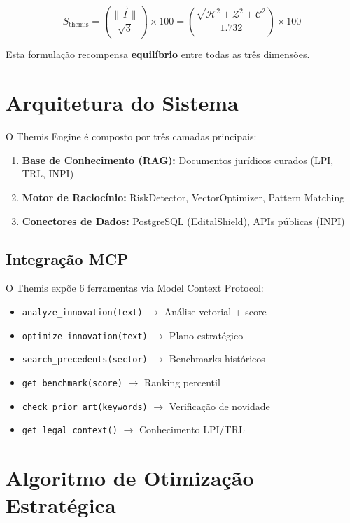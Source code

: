 \documentclass[12pt,a4paper]{article}
\begin{document}
\begin{equation}
S_{\text{themis}} = \left( \frac{\|\vec{I}\|}{\sqrt{3}} \right) \times 100 = \left( \frac{\sqrt{\mathcal{H}^2 + \mathcal{Z}^2 + \mathcal{C}^2}}{1.732} \right) \times 100
\end{equation}

Esta formulação recompensa \textbf{equilíbrio} entre todas as três dimensões.

\section{Arquitetura do Sistema}

O Themis Engine é composto por três camadas principais:

\begin{enumerate}
    \item \textbf{Base de Conhecimento (RAG):} Documentos jurídicos curados (LPI, TRL, INPI)
    \item \textbf{Motor de Raciocínio:} RiskDetector, VectorOptimizer, Pattern Matching
    \item \textbf{Conectores de Dados:} PostgreSQL (EditalShield), APIs públicas (INPI)
\end{enumerate}

\subsection{Integração MCP}

O Themis expõe 6 ferramentas via Model Context Protocol:
\begin{itemize}
    \item \texttt{analyze\_innovation(text)} $\to$ Análise vetorial + score
    \item \texttt{optimize\_innovation(text)} $\to$ Plano estratégico
    \item \texttt{search\_precedents(sector)} $\to$ Benchmarks históricos
    \item \texttt{get\_benchmark(score)} $\to$ Ranking percentil
    \item \texttt{check\_prior\_art(keywords)} $\to$ Verificação de novidade
    \item \texttt{get\_legal\_context()} $\to$ Conhecimento LPI/TRL
\end{itemize}

\section{Algoritmo de Otimização Estratégica}
\end{document}
